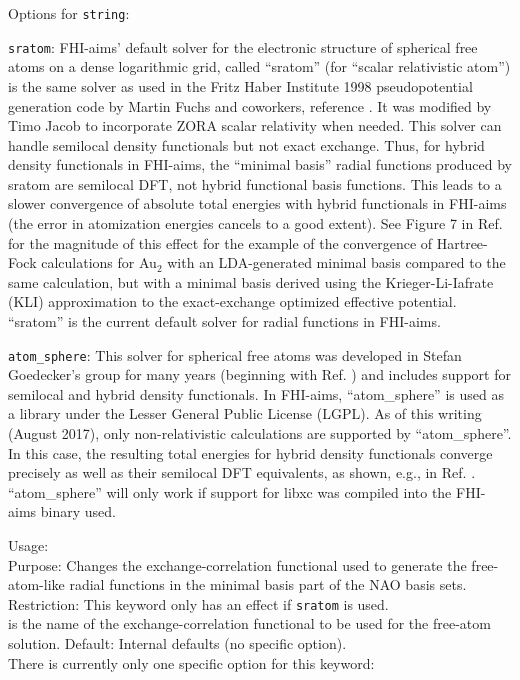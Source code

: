 Options
for \texttt{string}: 

\texttt{sratom}: FHI-aims' default solver for the electronic structure
of spherical free atoms on a dense logarithmic grid, called ``sratom'' (for
``scalar relativistic atom'') is the same solver as used in the
Fritz Haber Institute 1998 pseudopotential generation code by Martin
Fuchs and coworkers, reference \cite{FuchsFHI98PP}. It was modified by
Timo Jacob to incorporate ZORA scalar relativity when needed. This
solver can handle semilocal density functionals but not exact
exchange. Thus, for hybrid density functionals in FHI-aims, the
``minimal basis'' radial functions produced by sratom are semilocal
DFT, not hybrid functional basis functions. This leads to a slower
convergence of absolute total energies with hybrid functionals in
FHI-aims (the error in atomization energies cancels to a good
extent). See Figure 7 in Ref. \cite{Ren12a} for the magnitude of this
effect for the example of the convergence of Hartree-Fock calculations
for Au$_2$ with an LDA-generated minimal basis compared to the same
calculation, but with a minimal basis derived using the
Krieger-Li-Iafrate (KLI) approximation
\cite{Krieger1990,Krieger1992a,Krieger1992b} to the exact-exchange 
optimized effective potential. ``sratom'' is the current default
solver for radial functions in FHI-aims.

\texttt{atom\_sphere}: This solver for spherical free atoms was
developed in Stefan Goedecker's group for many years (beginning with
Ref. \cite{Goedecker1992}) and includes support for semilocal and
hybrid density functionals. In FHI-aims, ``atom\_sphere'' is used as a
library under the Lesser General Public License (LGPL). As of this writing
(August 2017), only non-relativistic calculations are supported by 
``atom\_sphere''. In this case, the resulting total energies
for hybrid density functionals converge precisely as well as their
semilocal DFT equivalents, as shown, e.g., in
Ref. \cite{Jensen2017}. ``atom\_sphere'' will only work if support 
for libxc was compiled into the FHI-aims binary used.


{\noindent
  Usage:   \\[1.0ex]
  Purpose: Changes the exchange-correlation functional used to generate the
  free-atom-like radial functions in the minimal basis
  part of the NAO basis sets.
  \\[1.0ex]
  Restriction: This keyword only has an effect if
   \texttt{sratom} is used. \\[1.0ex]
   is the name of the exchange-correlation functional
  to be used for the free-atom solution. Default: Internal defaults
  (no specific option).  \\
}
There is currently only one specific option for this keyword:

